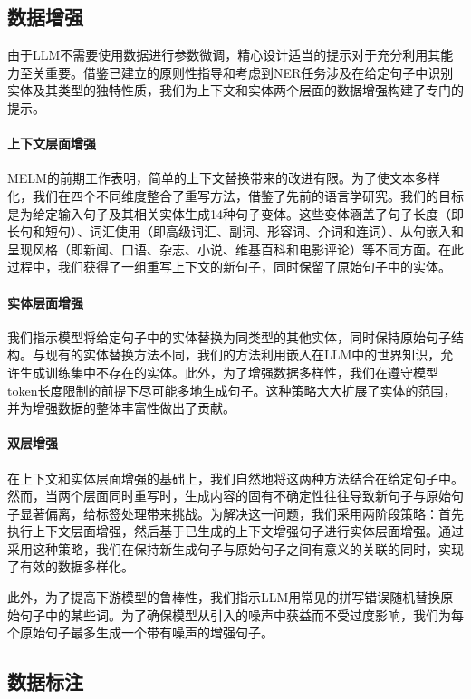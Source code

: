 \documentclass[supercite]{Experimental_Report}
\theoremstyle{definition}
\begin{document}
\subsection{数据增强}

由于LLM不需要使用数据进行参数微调，精心设计适当的提示对于充分利用其能力至关重要。借鉴已建立的原则性指导和考虑到NER任务涉及在给定句子中识别实体及其类型的独特性质，我们为上下文和实体两个层面的数据增强构建了专门的提示。

\paragraph{上下文层面增强}
MELM的前期工作表明，简单的上下文替换带来的改进有限。为了使文本多样化，我们在四个不同维度整合了重写方法，借鉴了先前的语言学研究。我们的目标是为给定输入句子及其相关实体生成14种句子变体。这些变体涵盖了句子长度（即长句和短句）、词汇使用（即高级词汇、副词、形容词、介词和连词）、从句嵌入和呈现风格（即新闻、口语、杂志、小说、维基百科和电影评论）等不同方面。在此过程中，我们获得了一组重写上下文的新句子，同时保留了原始句子中的实体。

\paragraph{实体层面增强}
我们指示模型将给定句子中的实体替换为同类型的其他实体，同时保持原始句子结构。与现有的实体替换方法不同，我们的方法利用嵌入在LLM中的世界知识，允许生成训练集中不存在的实体。此外，为了增强数据多样性，我们在遵守模型token长度限制的前提下尽可能多地生成句子。这种策略大大扩展了实体的范围，并为增强数据的整体丰富性做出了贡献。

\paragraph{双层增强}
在上下文和实体层面增强的基础上，我们自然地将这两种方法结合在给定句子中。然而，当两个层面同时重写时，生成内容的固有不确定性往往导致新句子与原始句子显著偏离，给标签处理带来挑战。为解决这一问题，我们采用两阶段策略：首先执行上下文层面增强，然后基于已生成的上下文增强句子进行实体层面增强。通过采用这种策略，我们在保持新生成句子与原始句子之间有意义的关联的同时，实现了有效的数据多样化。

此外，为了提高下游模型的鲁棒性，我们指示LLM用常见的拼写错误随机替换原始句子中的某些词。为了确保模型从引入的噪声中获益而不受过度影响，我们为每个原始句子最多生成一个带有噪声的增强句子。

\subsection{数据标注}
\end{document}
